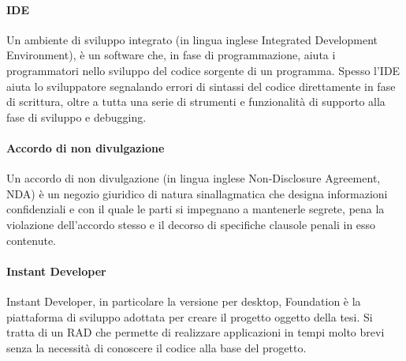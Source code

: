 \paragraph{IDE}
\label{IDE}
Un ambiente di sviluppo integrato (in lingua inglese Integrated Development Environment), è un software che, in fase di programmazione, aiuta i programmatori nello sviluppo del codice sorgente di un programma. 
Spesso l'IDE aiuta lo sviluppatore segnalando errori di sintassi del codice direttamente in fase di scrittura, oltre a tutta una serie di strumenti e funzionalità di supporto alla fase di sviluppo e debugging.

\paragraph{Accordo di non divulgazione}
\label{NDA}
Un accordo di non divulgazione (in lingua inglese Non-Disclosure Agreement, NDA) è un negozio giuridico di natura sinallagmatica che designa informazioni confidenziali e con il quale le parti si impegnano a mantenerle segrete, pena la violazione dell'accordo stesso e il decorso di specifiche clausole penali in esso contenute.

\paragraph{Instant Developer}
\label{InDe}
Instant Developer, in particolare la versione per desktop, Foundation è la piattaforma di sviluppo adottata per creare il progetto oggetto della tesi. Si tratta di un RAD che permette di realizzare applicazioni in tempi molto brevi senza la necessità di conoscere il codice alla base del progetto. 
